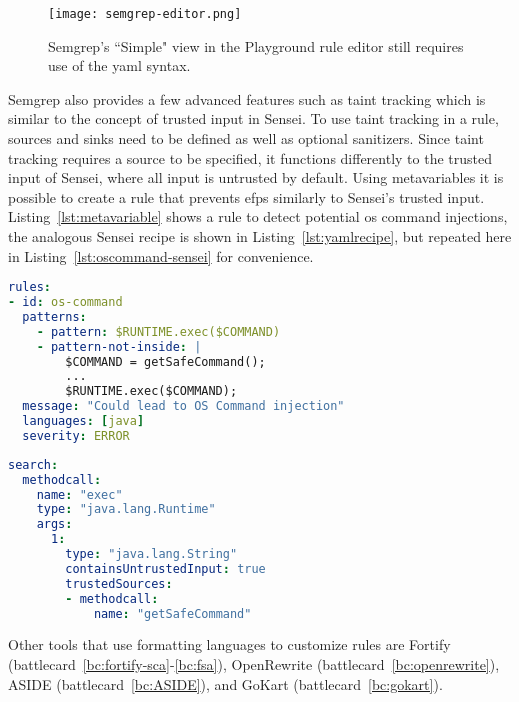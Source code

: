 \begin{sidewaysfigure}
  \centering
  \texttt{[image: semgrep-editor.png]}
  \caption[Semgrep playground editor]{Semgrep's ``Simple" view in the Playground rule editor still requires use of the \gls{yaml} syntax.}
  \label{fig:semgrep-editor} 
\end{sidewaysfigure}

Semgrep also provides a few advanced features such as taint tracking which is similar to the concept of trusted input in Sensei.
To use taint tracking in a rule, sources and sinks need to be defined as well as optional sanitizers.
Since taint tracking requires a source to be specified, it functions differently to the trusted input of Sensei, where all input is untrusted by default.
Using metavariables it is possible to create a rule that prevents \glspl{efp} similarly to Sensei's trusted input. 
Listing~\ref{lst:metavariable} shows a rule to detect potential \gls{os} command injections, the analogous Sensei recipe is shown in Listing~\ref{lst:yamlrecipe}, but repeated here in Listing~\ref{lst:oscommand-sensei} for convenience.

\begin{minipage}[t]{0.9\linewidth}
\begin{lstlisting}[language={yaml},caption={Semgrep rule to detect OS Command Injection. Any commands passed on to the \texttt{exec} method that have not been retrieved through \texttt{getSafeCommand} will be marked.},label={lst:metavariable},xleftmargin=15pt]
rules:
- id: os-command
  patterns:
    - pattern: $RUNTIME.exec($COMMAND)
    - pattern-not-inside: |
        $COMMAND = getSafeCommand();
        ...
        $RUNTIME.exec($COMMAND);
  message: "Could lead to OS Command injection"
  languages: [java]
  severity: ERROR

\end{lstlisting}

\begin{lstlisting}[language={yaml},caption={Sensei recipe to detect OS command injection. Any input is untrusted by default except input retrieved through \texttt{getSafeCommand}. Untrusted input passed on to the \texttt{exec} methodcall will be marked.},label={lst:oscommand-sensei},xleftmargin=15pt]
search:
  methodcall:
    name: "exec"
    type: "java.lang.Runtime"
    args:
      1:
        type: "java.lang.String"
        containsUntrustedInput: true
        trustedSources:
        - methodcall:
            name: "getSafeCommand"
\end{lstlisting}
\end{minipage}

Other tools that use formatting languages to customize rules are Fortify (battlecard~\ref{bc:fortify-sca}-\ref{bc:fsa}), OpenRewrite (battlecard~\ref{bc:openrewrite}), ASIDE (battlecard~\ref{bc:ASIDE}), and GoKart (battlecard~\ref{bc:gokart}).